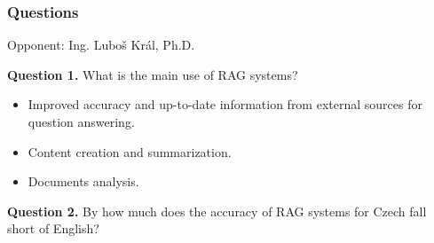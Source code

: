 \documentclass{beamer}
\begin{document}
\begin{frame}
  \frametitle{Questions}
  Opponent: Ing. Luboš Král, Ph.D.

  \textcolor{cvut_navy}{\textbf{Question 1.}} What is the main use of RAG systems?
  \begin{itemize}
    \item Improved accuracy and up-to-date information from external sources for question answering.
    \item Content creation and summarization.
    \item Documents analysis.
  \end{itemize}
  \textcolor{cvut_navy}{\textbf{Question 2.}} By how much does the accuracy of RAG systems for Czech fall short of English?
\end{frame}
\end{document}

